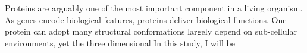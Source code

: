 Proteins are arguably one of the most important component in a living organism. As genes encode biological features, proteins deliver biological functions. One protein can adopt many structural conformations largely depend on sub-cellular environments, yet the three dimensional     In this study, I will be 